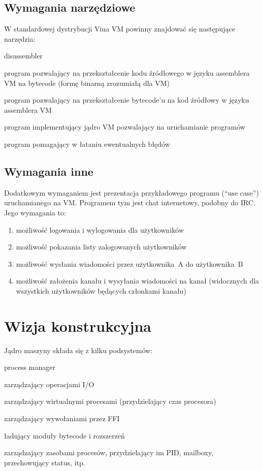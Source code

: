 \documentclass[11pt,oneside,a4paper,titlepage,onecolumn]{article}
\begin{document}
\subsection{Wymagania narzędziowe}

W standardowej dystrybucji Viua VM powinny znajdować się następujące narzędzia:

\begin{labeling}{disassembler}
\item [\texttt{assembler}] program pozwalający na przekształcenie kodu źródłowego w języku assemblera VM
    na bytecode (formę binarną zrozumiałą dla VM)
\item [\texttt{disassembler}] program pozwalający na przekształcenie bytecode'u na kod źródłowy w języku assemblera VM
\item [\texttt{kernel}] program implementujący jądro VM pozwalający na uruchamianie programów
\item [\texttt{debugger}] program pomagający w łataniu ewentualnych błędów
\end{labeling}

\subsection{Wymagania inne}

Dodatkowym wymaganiem jest prezentacja przykładowego programu (``use case'') uruchamianego na VM.
Programem tym jest chat internetowy, podobny do IRC. Jego wymagania to:

\begin{enumerate}
    \item możliwość logowania i wylogowania dla użytkowników
    \item możliwość pokazania listy zalogowanych użytkowników
    \item możliwość wysłania wiadomości przez użytkownika~A do użytkownika~B
    \item możliwość założenia kanału i wysyłania wiadomości na kanał (widocznych dla wszystkich użytkowników
        będących członkami kanału)
\end{enumerate}

\section{Wizja konstrukcyjna}

Jądro maszyny składa się z kilku podsystemów:

\begin{labeling}{process manager}
\item [scheduler IO] zarządzający operacjami I/O
\item [scheduler VP] zarządzający wirtualnymi procesami (przydzielający czas procesora)
\item [scheduler FFI] zarządzający wywołaniami przez FFI
\item [loader] ładujący moduły bytecode i rozszerzeń
\item [process manager] zarządzający zasobami procesów, przydzielający im PID, mailboxy, przechowujący status,
    itp.
\end{labeling}
\end{document}

